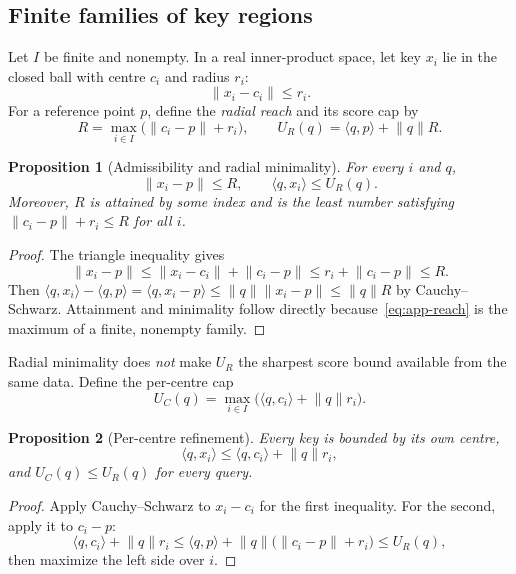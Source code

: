 \documentclass[11pt]{article}
\numberwithin{equation}{section}
\newtheorem{proposition}{Proposition}
\newcommand{\inner}[2]{\langle #1, #2\rangle}
\begin{document}
\subsection{Finite families of key regions}

Let $I$ be finite and nonempty. In a real inner-product space, let key $x_i$ lie in the closed ball with centre
$c_i$ and radius $r_i$:
\[
\lVert x_i-c_i\rVert\le r_i .
\]
For a reference point $p$, define the \emph{radial reach} and its score cap by
\begin{equation}\label{eq:app-reach}
R=\max_{i\in I}\bigl(\lVert c_i-p\rVert+r_i\bigr),
\qquad U_R(q)=\inner{q}{p}+\lVert q\rVert R .
\end{equation}

\begin{proposition}[Admissibility and radial minimality]\label{prop:app-radial}
For every $i$ and $q$,
\[
\lVert x_i-p\rVert\le R,
\qquad \inner{q}{x_i}\le U_R(q).
\]
Moreover, $R$ is attained by some index and is the least number satisfying
$\lVert c_i-p\rVert+r_i\le R$ for all $i$.
\end{proposition}
\begin{proof}
The triangle inequality gives
\[
\lVert x_i-p\rVert
\le \lVert x_i-c_i\rVert+\lVert c_i-p\rVert
\le r_i+\lVert c_i-p\rVert\le R.
\]
Then
$\inner{q}{x_i}-\inner{q}{p}=\inner{q}{x_i-p}
\le\lVert q\rVert\lVert x_i-p\rVert\le\lVert q\rVert R$
by Cauchy--Schwarz. Attainment and minimality follow directly because~\eqref{eq:app-reach} is the maximum of a
finite, nonempty family.
\end{proof}

Radial minimality does \emph{not} make $U_R$ the sharpest score bound available from the same data. Define the
per-centre cap
\begin{equation}\label{eq:app-per-centre}
U_C(q)=\max_{i\in I}\bigl(\inner{q}{c_i}+\lVert q\rVert r_i\bigr).
\end{equation}

\begin{proposition}[Per-centre refinement]\label{prop:app-per-centre}
Every key is bounded by its own centre,
\[
\inner{q}{x_i}\le\inner{q}{c_i}+\lVert q\rVert r_i,
\]
and $U_C(q)\le U_R(q)$ for every query.
\end{proposition}
\begin{proof}
Apply Cauchy--Schwarz to $x_i-c_i$ for the first inequality. For the second, apply it to $c_i-p$:
\[
\inner{q}{c_i}+\lVert q\rVert r_i
\le \inner{q}{p}+\lVert q\rVert
   \bigl(\lVert c_i-p\rVert+r_i\bigr)
\le U_R(q),
\]
then maximize the left side over $i$.
\end{proof}
\end{document}

